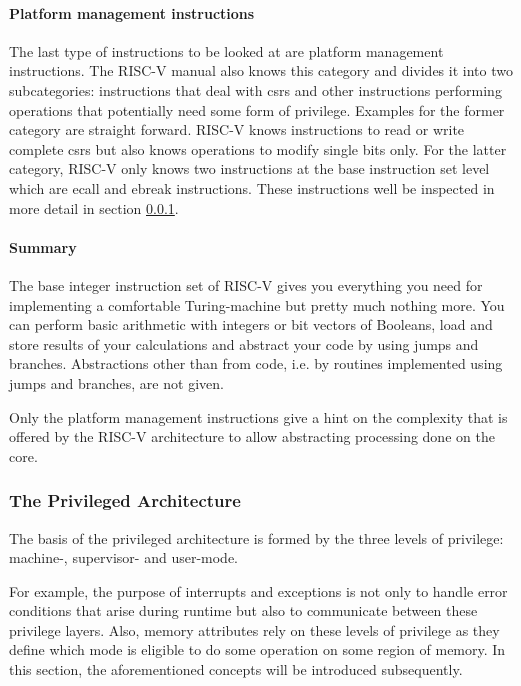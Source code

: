 \paragraph{Platform management instructions}
The last type of instructions to be looked at are platform management instructions.
The RISC-V manual also knows this category and divides it into two subcategories: instructions that deal with \glspl{csr} and other instructions performing operations that potentially need some form of privilege.
Examples for the former category are straight forward.
RISC-V knows instructions to read or write complete \glspl{csr} but also knows operations to modify single bits only.
For the latter category, RISC-V only knows two instructions at the base instruction set level which are \gls{ecall} and \gls{ebreak} instructions.
These instructions well be inspected in more detail in section \ref{sec:rv-priv-arch}.

\paragraph{Summary}
The base integer instruction set of RISC-V gives you everything you need for implementing a comfortable Turing-machine but pretty much nothing more.
You can perform basic arithmetic with integers or bit vectors of Booleans, load and store results of your calculations and abstract your code by using jumps and branches.
Abstractions other than from code, i.e. by routines implemented using jumps and branches, are not given.

Only the platform management instructions give a hint on the complexity that is offered by the RISC-V architecture to allow abstracting processing done on the core.

\subsubsection{The Privileged Architecture}
\label{sec:rv-priv-arch}

The basis of the privileged architecture is formed by the three levels of privilege: machine-, supervisor- and user-mode.

For example, the purpose of interrupts and exceptions is not only to handle error conditions that arise during runtime but also to communicate between these privilege layers.
Also, memory attributes rely on these levels of privilege as they define which mode is eligible to do some operation on some region of memory.
In this section, the aforementioned concepts will be introduced subsequently.

